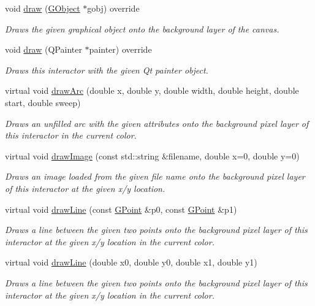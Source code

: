 \begin{DoxyCompactItemize}
void \mbox{\hyperlink{classGCanvas_a7f7f6c1798bcedfd52151b458074e8a0}{draw}} (\mbox{\hyperlink{classGObject}{G\+Object}} $\ast$gobj) override
\begin{DoxyCompactList}\small\item\em Draws the given graphical object onto the background layer of the canvas. \end{DoxyCompactList}\item 
void \mbox{\hyperlink{classGCanvas_ab4536ea39f3b3899136554bdd5bda581}{draw}} (Q\+Painter $\ast$painter) override
\begin{DoxyCompactList}\small\item\em Draws this interactor with the given Qt painter object. \end{DoxyCompactList}\item 
virtual void \mbox{\hyperlink{classGDrawingSurface_a38b6fae1045191c57092b49905068144}{draw\+Arc}} (double x, double y, double width, double height, double start, double sweep)
\begin{DoxyCompactList}\small\item\em Draws an unfilled arc with the given attributes onto the background pixel layer of this interactor in the current color. \end{DoxyCompactList}\item 
virtual void \mbox{\hyperlink{classGDrawingSurface_abdd4cb1f2c64adc5d03522a1ee30febf}{draw\+Image}} (const std\+::string \&filename, double x=0, double y=0)
\begin{DoxyCompactList}\small\item\em Draws an image loaded from the given file name onto the background pixel layer of this interactor at the given x/y location. \end{DoxyCompactList}\item 
virtual void \mbox{\hyperlink{classGDrawingSurface_ae6a24b6b9a6e795d3165c1c750d5bdf1}{draw\+Line}} (const \mbox{\hyperlink{structGPoint}{G\+Point}} \&p0, const \mbox{\hyperlink{structGPoint}{G\+Point}} \&p1)
\begin{DoxyCompactList}\small\item\em Draws a line between the given two points onto the background pixel layer of this interactor at the given x/y location in the current color. \end{DoxyCompactList}\item 
virtual void \mbox{\hyperlink{classGDrawingSurface_aff299fe83178d2f3ce8c08c06b583484}{draw\+Line}} (double x0, double y0, double x1, double y1)
\begin{DoxyCompactList}\small\item\em Draws a line between the given two points onto the background pixel layer of this interactor at the given x/y location in the current color. \end{DoxyCompactList}\item 

\end{DoxyCompactItemize}
